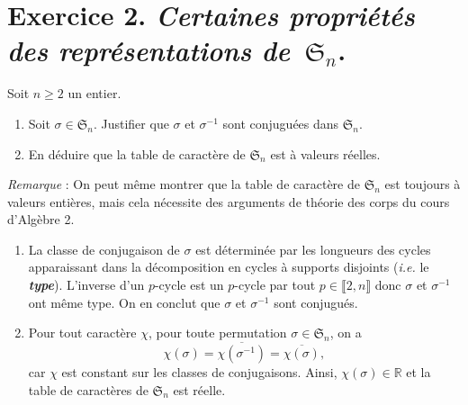 \documentclass[./main]{subfiles}
\begin{document}
  \section{Exercice 2. \textit{Certaines propriétés des représentations de~$\mathfrak{S}_n$}.}

  \begin{enonce}
    Soit $n \ge 2$ un entier.
    \begin{enumerate}
      \item Soit $\sigma \in \mathfrak{S}_n$.
        Justifier que $\sigma$ et $\sigma^{-1}$ sont conjuguées dans $\mathfrak{S}_n$.
      \item En déduire que la table de caractère de $\mathfrak{S}_n$ est à valeurs réelles.
    \end{enumerate}

    \textit{Remarque} : On peut même montrer que la table de caractère de $\mathfrak{S}_n$ est toujours à valeurs entières, mais cela nécessite des arguments de théorie des corps du cours d'Algèbre 2.
  \end{enonce}

  \begin{enumerate}
    \item La classe de conjugaison de $\sigma$ est déterminée par les longueurs des cycles apparaissant dans la décomposition en cycles à supports disjoints (\textit{i.e.} le \textit{\textbf{type}}).
      L'inverse d'un $p$-cycle est un $p$-cycle par tout $p \in \llbracket 2,n\rrbracket$ donc $\sigma$ et $\sigma^{-1}$ ont même type.
      On en conclut que $\sigma$ et $\sigma^{-1}$ sont conjugués.
    \item Pour tout caractère $\chi$, pour toute permutation  $\sigma \in \mathfrak{S}_n$, on a \[
          \chi(\sigma) = \overline{\chi(\sigma^{-1})} = \overline{\chi(\sigma)}
      ,\]
      car $\chi$ est constant sur les classes de conjugaisons. Ainsi,  $\chi(\sigma) \in \mathds{R}$ et la table de caractères de $\mathfrak{S}_n$ est réelle.
  \end{enumerate}
\end{document}
